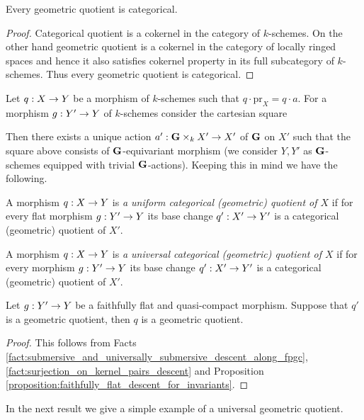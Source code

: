 \begin{fact}\label{fact:geometric_quotients_are_categorical}
Every geometric quotient is categorical.
\end{fact}
\begin{proof}
Categorical quotient is a cokernel in the category of $k$-schemes. On the other hand geometric quotient is a cokernel in the category of locally ringed spaces and hence it also satisfies cokernel property in its full subcategory of $k$-schemes. Thus every geometric quotient is categorical.
\end{proof}
\noindent
Let $q:X\rightarrow Y$ be a morphism of $k$-schemes such that $q\cdot \mathrm{pr}_X = q\cdot a$. For a morphism $g:Y'\rightarrow Y$ of $k$-schemes consider the cartesian square
\begin{center}
\end{center} 
Then there exists a unique action $a':\mathbf{G} \times_kX' \rightarrow X'$ of $\mathbf{G}$ on $X'$ such that the square above consists of $\mathbf{G}$-equivariant morphism (we consider $Y,Y'$ as $\mathbf{G}$-schemes equipped with trivial $\mathbf{G}$-actions). Keeping this in mind we have the following.

\begin{definition}
A morphism $q:X\rightarrow Y$ is \textit{a uniform categorical (geometric) quotient of $X$} if for every flat morphism $g:Y'\rightarrow Y$ its base change $q':X'\rightarrow Y'$ is a categorical (geometric) quotient of $X'$. 
\end{definition}

\begin{definition}
A morphism $q:X\rightarrow Y$ is \textit{a universal categorical (geometric) quotient of $X$} if for every morphism $g:Y'\rightarrow Y$ its base change $q':X'\rightarrow Y'$ is a categorical (geometric) quotient of $X'$. 
\end{definition}

\begin{corollary}\label{corollary:geometric_quotients_descent_along_fpqc}
Let $g:Y'\rightarrow Y$ be a faithfully flat and quasi-compact morphism. Suppose that $q'$ is a geometric quotient, then $q$ is a geometric quotient.
\end{corollary}
\begin{proof}
This follows from Facts \ref{fact:submersive_and_universally_submersive_descent_along_fpgc}, \ref{fact:surjection_on_kernel_pairs_descent} and Proposition \ref{proposition:faithfully_flat_descent_for_invariants}.
\end{proof}
\noindent
In the next result we give a simple example of a universal geometric quotient.

